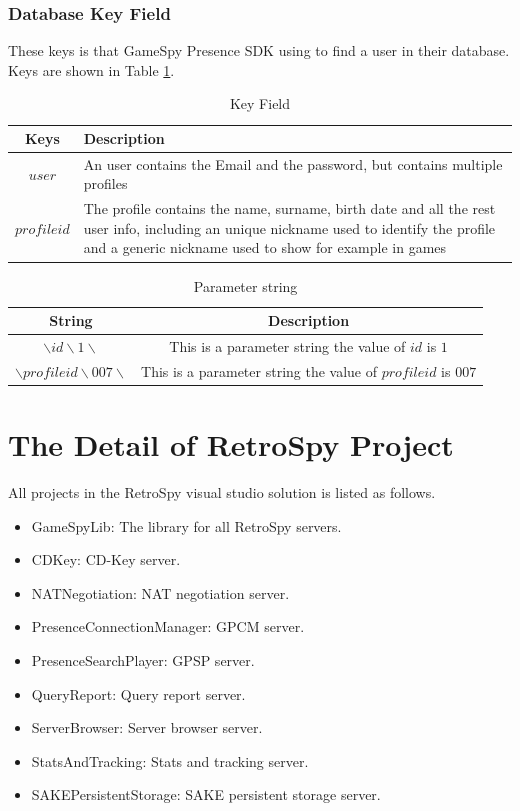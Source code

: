 \documentclass[oneside,titlepage,a4paper]{Definition/retrospy} %
\begin{document}
\subsection{Database Key Field}
These keys is that GameSpy Presence SDK using to find a user in their database. Keys are shown in Table \ref{Key Field}.

\begin{table}[H]
	\centering
	\begin{tabular}{|c|>{\centering\arraybackslash}p{8cm}|}
		\hline 
		\textbf{Keys}& \textbf{Description}  \\ 
		\hline 
		$user$ & An user contains the Email and the password, but contains multiple profiles \\ 		
		\hline 
		$profileid$ & The profile contains the name, surname, birth date and all the rest user info, including
		an unique nickname used to identify the profile and a generic nickname used to show for example in
		games \\
		\hline 
	\end{tabular} 
	\caption{Key Field}
	\label{Key Field}	
\end{table}

\begin{table}[H]
	\centering
	\begin{tabular}{|c|c|}
		\hline 
		\textbf{String}&\textbf{Description}  \\ 
		\hline 
		$ \backslash id \backslash 1 \backslash $& This is a parameter string the value of $ id $ is $ 1 $ \\ 		
		\hline 
		$ \backslash profileid \backslash 007 \backslash $ & This is a parameter string the value of $ profileid $ is $ 007 $ \\
		\hline
	\end{tabular} 
	\caption{Parameter string}
	\label{Parameter string}
\end{table}

\chapter{The Detail of RetroSpy Project}
All projects in the RetroSpy visual studio solution is listed as follows.
\begin{itemize}
	\item GameSpyLib: The library for all RetroSpy servers.
	\item CDKey: CD-Key server.
	\item NATNegotiation: NAT negotiation server.
	\item PresenceConnectionManager: GPCM server.
	\item PresenceSearchPlayer:  GPSP server.
	\item QueryReport: Query report server.
	\item ServerBrowser: Server browser server.
	\item StatsAndTracking: Stats and tracking server.
	\item SAKEPersistentStorage: SAKE persistent storage server.
\end{itemize}
\end{document}
